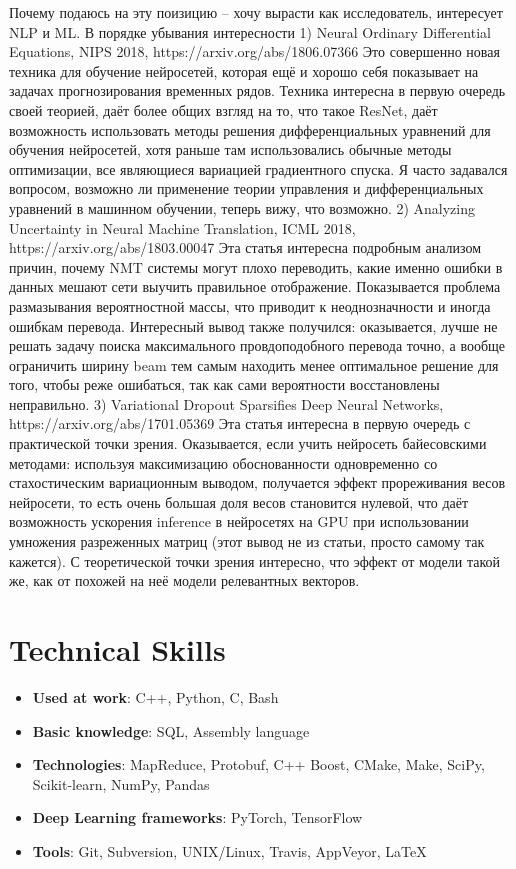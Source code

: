 \documentclass[letterpaper,11pt]{article}
\newcommand{\resumeItem}[2]{
  \item\small{
    \textbf{#1}{: #2 \vspace{-2pt}}
  }
}
\newcommand{\resumeSubItem}[2]{\resumeItem{#1}{#2}\vspace{-4pt}}
\newcommand{\resumeSubHeadingListStart}{\begin{itemize}[leftmargin=*]}
\newcommand{\resumeSubHeadingListEnd}{\end{itemize}}
\begin{document}
Почему подаюсь на эту поизицию -- хочу вырасти как исследователь, интересует NLP и ML.
В порядке убывания интересности
1) Neural Ordinary Differential Equations, NIPS 2018, https://arxiv.org/abs/1806.07366
Это совершенно новая техника для обучение нейросетей, которая ещё и хорошо себя показывает на задачах прогнозирования временных рядов. Техника интересна в первую очередь своей теорией, даёт более общих взгляд на то, что такое ResNet, даёт возможность использовать методы решения дифференциальных уравнений для обучения нейросетей, хотя раньше там использовались обычные методы оптимизации, все являющиеся вариацией градиентного спуска. Я часто задавался вопросом, возможно ли применение теории управления и дифференциальных уравнений в машинном обучении, теперь вижу, что возможно.
2) Analyzing Uncertainty in Neural Machine Translation, ICML 2018, https://arxiv.org/abs/1803.00047
Эта статья интересна подробным анализом причин, почему NMT системы могут плохо переводить, какие именно ошибки в данных мешают сети выучить правильное отображение. Показывается проблема размазывания вероятностной массы, что приводит к неоднозначности и иногда ошибкам перевода. Интересный вывод также получился: оказывается, лучше не решать задачу поиска максимального провдоподобного перевода точно, а вообще ограничить ширину beam тем самым находить менее оптимальное решение для того, чтобы реже ошибаться, так как сами вероятности восстановлены неправильно.
3) Variational Dropout Sparsifies Deep Neural Networks, https://arxiv.org/abs/1701.05369
Эта статья интересна в первую очередь с практической точки зрения. Оказывается, если учить нейросеть байесовскими методами: используя максимизацию обоснованности одновременно со стахостическим вариационным выводом, получается эффект прореживания весов нейросети, то есть очень большая доля весов становится нулевой, что даёт возможность ускорения inference в нейросетях на GPU при использовании умножения разреженных матриц (этот вывод не из статьи, просто самому так кажется). С теоретической точки зрения интересно, что эффект от модели такой же, как от похожей на неё модели релевантных векторов.



\vspace{-23pt}
\section{Technical Skills}
  \resumeSubHeadingListStart
    \resumeSubItem{Used at work}{C++, Python, C, Bash}
    \resumeSubItem{Basic knowledge}{SQL, Assembly language}
    \resumeSubItem{Technologies}{MapReduce, Protobuf, C++ Boost, CMake, Make, SciPy, Scikit-learn, NumPy, Pandas}
    \resumeSubItem{Deep Learning frameworks}{PyTorch, TensorFlow}
    \resumeSubItem{Tools}{Git, Subversion, UNIX/Linux, Travis, AppVeyor, \LaTeX}
  \resumeSubHeadingListEnd

\end{document}
